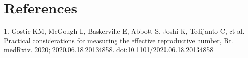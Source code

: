 \documentclass[]{article}
\begin{document}
\hypertarget{references}{%
\section*{References}\label{references}}

\hypertarget{refs}{}
\leavevmode\hypertarget{ref-gosticPracticalConsiderationsMeasuring2020}{}%
1. Gostic KM, McGough L, Baskerville E, Abbott S, Joshi K, Tedijanto C,
et al. Practical considerations for measuring the effective reproductive
number, Rt. medRxiv. 2020; 2020.06.18.20134858.
doi:\href{https://doi.org/10.1101/2020.06.18.20134858}{10.1101/2020.06.18.20134858}
\end{document}

